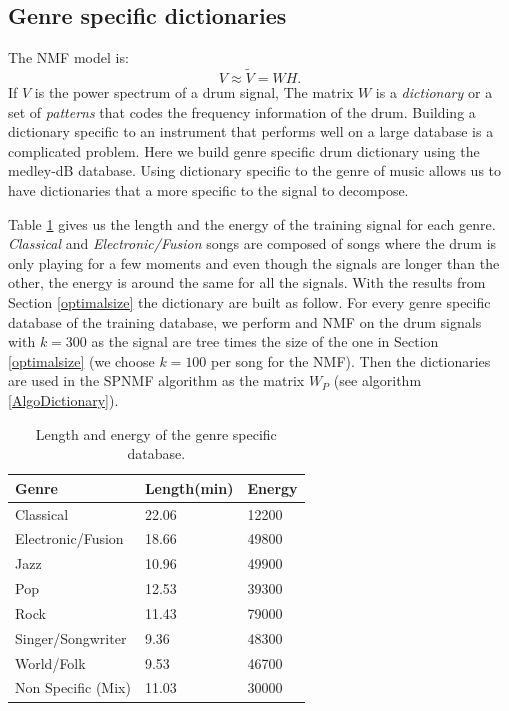 \documentclass{article}
\begin{document}
\subsection{Genre specific dictionaries}\label{genrespecdict}

The NMF model is:
\begin{equation}
V \approx \tilde{V} = WH.
\end{equation}
If $V$ is the power spectrum of a drum signal, The matrix $W$ is a {\em dictionary} or a set of {\em patterns} that codes the frequency information of the drum. Building a dictionary specific to an instrument that performs well on a large database is a complicated problem. Here we build genre specific drum dictionary using the medley-dB database. Using dictionary specific to the genre of music allows us to have dictionaries that a more specific to the signal to decompose.

Table \ref{lengthDict} gives us the length and the energy of the training signal for each genre. \emph{Classical} and \emph{Electronic/Fusion} songs are composed of songs where the drum is only playing for a few moments and even though the signals are longer than the other, the energy is around the same for all the signals. With the results from Section \ref{optimalsize} the dictionary are built as follow. For every genre specific database of the training database, we perform and NMF on the drum signals with $k=300$ as the signal are tree times the size of the one in Section \ref{optimalsize} (we choose $k=100$ per song for the NMF). Then the dictionaries are used in the SPNMF algorithm as the matrix $W_P$ (see algorithm \ref{AlgoDictionary}).

\begin{table}
   
	\centering 
   \begin{tabular}{|l|l|l|}
\hline   
Genre & Length(min) & Energy\\
\hline
Classical  & 22.06 & 12200 \\
\hline
Electronic/Fusion & 18.66 & 49800\\
\hline
Jazz & 10.96 & 49900\\
\hline
Pop &  12.53 & 39300\\
\hline
Rock & 11.43& 79000\\
\hline
Singer/Songwriter & 9.36 & 48300\\
\hline
World/Folk & 9.53 & 46700\\
\hline
Non Specific (Mix) & 11.03 & 30000 \\
\hline
  
\end{tabular} 
\caption{\label{lengthDict} Length and energy of the genre specific database.}
\end{table}
\end{document}
